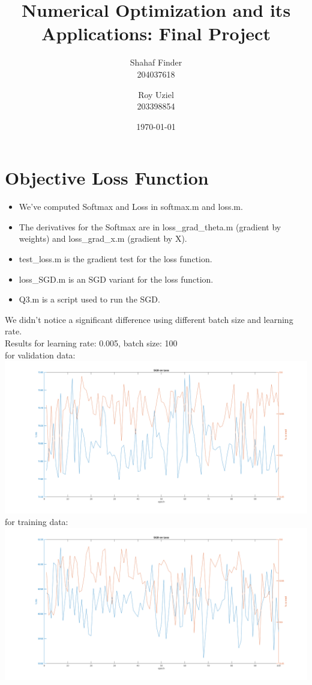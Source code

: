 \documentclass{article}
\title{Numerical Optimization and its Applications: Final Project}
\author{
    Shahaf Finder\\
    204037618
    \and
    Roy Uziel\\
    203398854
}
\date{\today}
\numberwithin{equation}{section}
\begin{document}
\maketitle

\section{Objective Loss Function}
\begin{itemize}
 \item
  We've computed Softmax and Loss in softmax.m and loss.m.
  \item
  The derivatives for the Softmax are in loss{\_}grad{\_}theta.m (gradient by weights) and loss{\_}grad{\_}x.m (gradient by X).
  \item
  test{\_}loss.m is the gradient test for the loss function.
  \item
  loss{\_}SGD.m is an SGD variant for the loss function.
  \item
  Q3.m is a script used to run the SGD.
\end{itemize}
We didn't notice a significant difference using different batch size and learning rate.\\

Results for learning rate: 0.005, batch size: 100\\

for validation data:\\
\includegraphics[width=\textwidth]{loss_sgd_val.png}\\

for training data:\\
\includegraphics[width=\textwidth]{loss_sgd_train.png}\\
\end{document}
